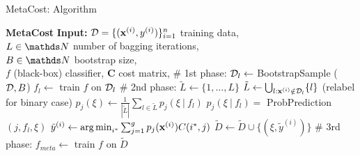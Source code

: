 \documentclass[11pt,compress,t,notes=noshow, xcolor=table]{beamer}
\begin{document}
\begin{vbframe}{MetaCost: Algorithm}
{\begin{minipage}{0.45\textwidth}
\begin{algorithmic}
				\tiny
%				
				\State \textbf{MetaCost}  
				\State \textbf{Input:} 
				$\mathcal{D} = \{(\mathbf{x}^{(i)},y^{(i)})\}_{i=1}^n$ training data, \\
				$L \in \N$ number of bagging iterations, \\
				$B \in \N$ bootstrap size, \\
				$f$ (black-box) classifier, 
				$\mathbf{C}$ cost matrix, 
				\State \# 1st phase:
					\State $\mathcal{D}_l  \leftarrow $ BootstrapSample ($\mathcal{D},B$)
					\State $f_l  \leftarrow $ train $f$ on $\mathcal{D}_l$
				\EndFor
				\State \# 2nd phase:
						\State $\tilde L \leftarrow \{1,\ldots,L\}$
					\Else
						\State $\tilde L \leftarrow \bigcup_{l: \mathbf{x}^{(i)} \notin \mathcal{D}_l} \{l\}$
					\EndIf
					 (relabel for binary case)
						\State $p_j(\xi)  \leftarrow \frac{1}{|\tilde L| } \sum_{l \in \tilde L}   p_j(\xi~|~ f_l) $
						\State $p_j(\xi~|~ f_l) = $ ProbPrediction$(j,f_l,\xi)$
						\State $\tilde y^{(i)} \leftarrow \operatorname{arg\,min}_{i^*} \sum_{j=1}^g p_j(\mathbf{x}^{(i)}) C(i^*,j) $
					\EndFor
					\State $\tilde D \leftarrow \tilde D \cup \{(\xi,\tilde y^{(i)})\} $
				\EndFor
				\State \# 3rd phase:
%				
				\State $f_{meta} \leftarrow$ train $f$ on $\tilde D$
%			
			\end{algorithmic}
		\end{minipage}
	}
\end{vbframe}




\end{document}

